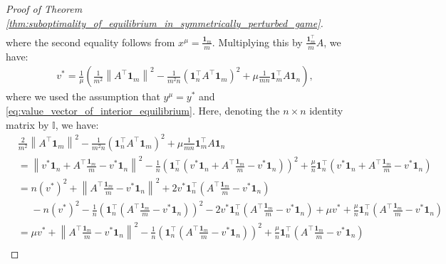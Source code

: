 \documentclass{article}
\newcommand{\bone}{\mathbf{1}}
\theoremstyle{plain}
\begin{document}
\begin{proof}[Proof of Theorem \ref{thm:suboptimality_of_equilibrium_in_symmetrically_perturbed_game}]
\begin{align*}
    \end{align*}
    where the second equality follows from $x^{\mu} = \frac{\bone_m}{m}$.
    Multiplying this by $\frac{\bone_m^{\top}}{m}A$, we have:
    \begin{align}
        v^{\ast} = \frac{1}{\mu}\left(\frac{1}{m^2}\left\|A^{\top}\bone_m\right\|^2 - \frac{1}{m^2n}(\bone_n^{\top}A^{\top}\bone_m)^2  + \mu\frac{1}{m n}\bone_m^{\top}A\bone_n\right),
        \label{eq:game_value_equivalence}
    \end{align}
    where we used the assumption that $y^{\mu} = y^{\ast}$ and \eqref{eq:value_vector_of_interior_equilibrium}.
    Here, denoting the $n\times n$ identity matrix by $\mathbb{I}$, we have:
    \begin{align}
        & \frac{2}{m^2}\left\|A^{\top}\bone_m\right\|^2 - \frac{1}{m^2n}(\bone_n^{\top}A^{\top}\bone_m)^2  + \mu\frac{1}{m n}\bone_m^{\top}A\bone_n \nonumber                                                                                                                                                                             \\
        & = \left\|v^{\ast}\bone_n + A^{\top}\frac{\bone_m}{m} - v^{\ast}\bone_n\right\|^2 - \frac{1}{n}\left(\bone_n^{\top}\left(v^{\ast}\bone_n + A^{\top}\frac{\bone_m}{m} - v^{\ast}\bone_n\right)\right)^2 + \frac{\mu}{n}\bone_n^{\top}\left(v^{\ast}\bone_n + A^{\top}\frac{\bone_m}{m} - v^{\ast}\bone_n\right) \nonumber         \\
        & = n (v^{\ast})^2 + \left\|A^{\top}\frac{\bone_m}{m} - v^{\ast}\bone_n\right\|^2 + 2v^{\ast}\bone_n^{\top}\left(A^{\top}\frac{\bone_m}{m} - v^{\ast}\bone_n\right) \nonumber                                                                                                                                                     \\
        & \phantom{=} - n(v^{\ast})^2 - \frac{1}{n}\left(\bone_n^{\top}\left(A^{\top}\frac{\bone_m}{m} - v^{\ast}\bone_n\right)\right)^2 - 2v^{\ast}\bone_n^{\top}\left(A^{\top}\frac{\bone_m}{m} - v^{\ast}\bone_n\right) + \mu v^{\ast} + \frac{\mu}{n}\bone_n^{\top}\left(A^{\top}\frac{\bone_m}{m} - v^{\ast}\bone_n\right) \nonumber \\
        & = \mu v^{\ast} + \left\|A^{\top}\frac{\bone_m}{m} - v^{\ast}\bone_n\right\|^2 - \frac{1}{n}\left(\bone_n^{\top}\left(A^{\top}\frac{\bone_m}{m} - v^{\ast}\bone_n\right)\right)^2 + \frac{\mu}{n}\bone_n^{\top}\left(A^{\top}\frac{\bone_m}{m} - v^{\ast}\bone_n\right) \nonumber                                                \\

\end{align}
\end{proof}
\end{document}
